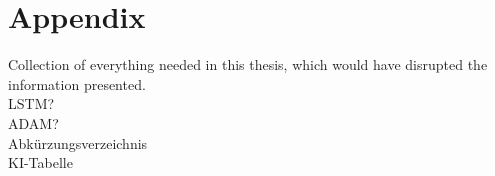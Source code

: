 \chapter{Appendix}
Collection of everything needed in this thesis, which would have disrupted the information presented. \\


LSTM?\\

ADAM?\\

Abkürzungsverzeichnis\\

KI-Tabelle

